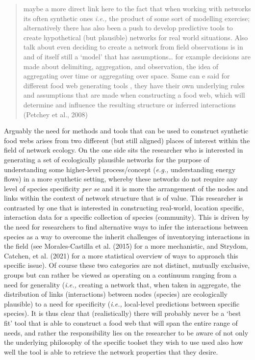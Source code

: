 \documentclass[
]{article}
\begin{document}
\begin{quote}
maybe a more direct link here to the fact that when working with
networks its often synthetic ones \emph{i.e.,} the product of some sort
of modelling exercise; alternatively there has also been a push to
develop predictive tools to create hypothetical (but plausible) networks
for real world situations. Also talk about even deciding to create a
network from field observations is in and of itself still a `model' that
has assumptions\ldots{} for example decisions are made about delimiting,
aggregation, and observation, the idea of aggregating over time or
aggregating over space. Same can e said for different food web
generating tools , they have their own underlying rules and assumptions
that are made when constructing a food web, which will determine and
influence the resulting structure or inferred interactions (Petchey et
al., 2008)
\end{quote}

Arguably the need for methods and tools that can be used to construct
synthetic food webs arises from two different (but still aligned) places
of interest within the field of network ecology. On the one side sits
the researcher who is interested in generating a set of ecologically
plausible networks for the purpose of understanding some higher-level
process/concept (\emph{e.g.,} understanding energy flows) in a more
synthetic setting, whereby these networks do not require any level of
species specificity \emph{per se} and it is more the arrangement of the
nodes and links within the context of network structure that is of
value. This researcher is contrasted by one that is interested in
constructing real-world, location specific, interaction data for a
specific collection of species (community). This is driven by the need
for researchers to find alternative ways to infer the interactions
between species as a way to overcome the inherit challenges of
inventorying interactions in the field (see Morales-Castilla et al.
(2015) for a more mechanistic, and Strydom, Catchen, et al. (2021) for a
more statistical overview of ways to approach this specific issue). Of
course these two categories are not distinct, mutually exclusive, groups
but can rather be viewed as operating on a continuum ranging from a need
for generality (\emph{i.e.,} creating a network that, when taken in
aggregate, the distribution of links (interactions) between nodes
(species) are ecologically plausible) to a need for specificity
(\emph{i.e.,} local-level predictions between specific species). It is
thus clear that (realistically) there will probably never be a `best
fit' tool that is able to construct a food web that will span the entire
range of needs, and rather the responsibility lies on the researcher to
be aware of not only the underlying philosophy of the specific toolset
they wish to use used also how well the tool is able to retrieve the
network properties that they desire.
\end{document}
